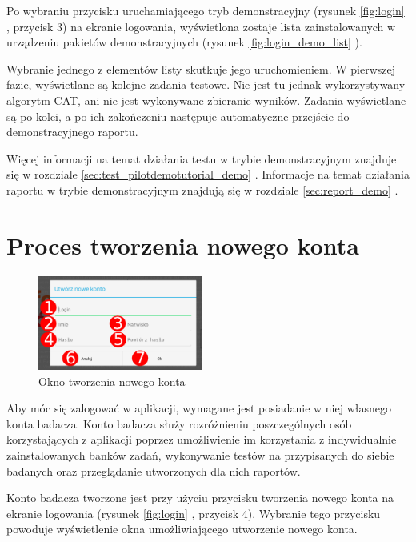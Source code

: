 \documentclass[a4paper,10pt,twosided]{book}
\newcommand{\refwithpage}[3]{
\ref{#1}\ifthenelse{\equal{\thepage}{\pageref{#1}}}{}{#2\pageref{#1}#3}%
}
\newcommand{\pref}[1]{\refwithpage{#1}{ (strona }{)}}
\newcommand{\ppref}[1]{\refwithpage{#1}{ -- strona }{}}
\begin{document}
Po wybraniu przycisku uruchamiającego tryb demonstracyjny (rysunek \ppref{fig:login}, przycisk 3) na ekranie logowania, wyświetlona zostaje lista zainstalowanych w urządzeniu pakietów demonstracyjnych (rysunek \ppref{fig:login_demo_list}).

Wybranie jednego z elementów listy skutkuje jego uruchomieniem. W pierwszej fazie, wyświetlane są kolejne zadania testowe. Nie jest tu jednak wykorzystywany algorytm CAT, ani nie jest wykonywane zbieranie wyników. Zadania wyświetlane są po kolei, a po ich zakończeniu następuje automatyczne przejście do demonstracyjnego raportu.

Więcej informacji na temat działania testu w trybie demonstracyjnym znajduje się w rozdziale \pref{sec:test_pilotdemotutorial_demo}. Informacje na temat działania raportu w trybie demonstracyjnym znajdują się w rozdziale \pref{sec:report_demo}.


\section{Proces tworzenia nowego konta}
\label{sec:login_createaccount}

\begin{figure}
\vspace{-1em}
\includegraphics[width=0.48\textwidth]{activity_login-create_account.pdf}
\caption{Okno tworzenia nowego konta}
\label{fig:login_new_account}
\end{figure}

Aby móc się zalogować w aplikacji, wymagane jest posiadanie w niej własnego konta badacza. Konto badacza służy rozróżnieniu poszczególnych osób korzystających z aplikacji poprzez umożliwienie im korzystania z indywidualnie zainstalowanych banków zadań, wykonywanie testów na przypisanych do siebie badanych oraz przeglądanie utworzonych dla nich raportów.

Konto badacza tworzone jest przy użyciu przycisku tworzenia nowego konta na ekranie logowania (rysunek \ppref{fig:login}, przycisk 4). Wybranie tego przycisku powoduje wyświetlenie okna umożliwiającego utworzenie nowego konta.
\end{document}
